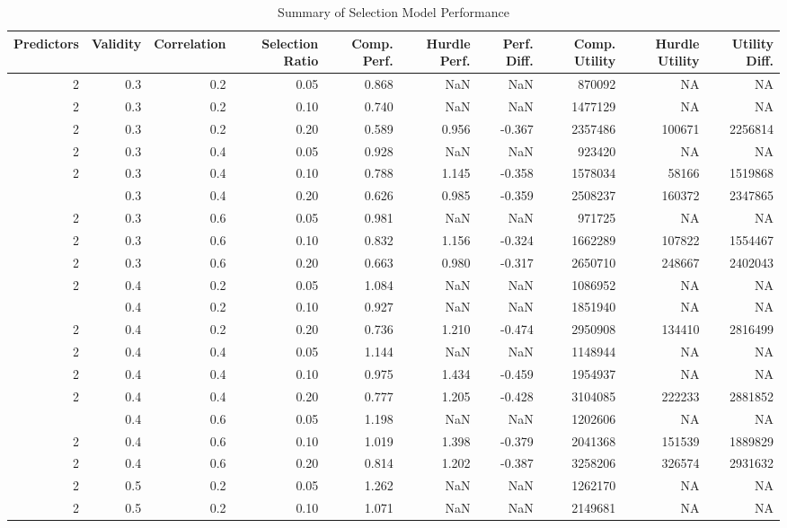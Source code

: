 \documentclass[
]{article}
\begin{document}
\begin{longtable}[t]{rrrrrrrrrr}
\caption{\label{tab:overall_results}Summary of Selection Model Performance}\\
\toprule
Predictors & Validity & Correlation & Selection Ratio & Comp. Perf. & Hurdle Perf. & Perf. Diff. & Comp. Utility & Hurdle Utility & Utility Diff.\\
\midrule
2 & 0.3 & 0.2 & 0.05 & 0.868 & NaN & NaN & 870092 & NA & NA\\
2 & 0.3 & 0.2 & 0.10 & 0.740 & NaN & NaN & 1477129 & NA & NA\\
2 & 0.3 & 0.2 & 0.20 & 0.589 & 0.956 & -0.367 & 2357486 & 100671 & 2256814\\
2 & 0.3 & 0.4 & 0.05 & 0.928 & NaN & NaN & 923420 & NA & NA\\
2 & 0.3 & 0.4 & 0.10 & 0.788 & 1.145 & -0.358 & 1578034 & 58166 & 1519868\\
\addlinespace
2 & 0.3 & 0.4 & 0.20 & 0.626 & 0.985 & -0.359 & 2508237 & 160372 & 2347865\\
2 & 0.3 & 0.6 & 0.05 & 0.981 & NaN & NaN & 971725 & NA & NA\\
2 & 0.3 & 0.6 & 0.10 & 0.832 & 1.156 & -0.324 & 1662289 & 107822 & 1554467\\
2 & 0.3 & 0.6 & 0.20 & 0.663 & 0.980 & -0.317 & 2650710 & 248667 & 2402043\\
2 & 0.4 & 0.2 & 0.05 & 1.084 & NaN & NaN & 1086952 & NA & NA\\
\addlinespace
2 & 0.4 & 0.2 & 0.10 & 0.927 & NaN & NaN & 1851940 & NA & NA\\
2 & 0.4 & 0.2 & 0.20 & 0.736 & 1.210 & -0.474 & 2950908 & 134410 & 2816499\\
2 & 0.4 & 0.4 & 0.05 & 1.144 & NaN & NaN & 1148944 & NA & NA\\
2 & 0.4 & 0.4 & 0.10 & 0.975 & 1.434 & -0.459 & 1954937 & NA & NA\\
2 & 0.4 & 0.4 & 0.20 & 0.777 & 1.205 & -0.428 & 3104085 & 222233 & 2881852\\
\addlinespace
2 & 0.4 & 0.6 & 0.05 & 1.198 & NaN & NaN & 1202606 & NA & NA\\
2 & 0.4 & 0.6 & 0.10 & 1.019 & 1.398 & -0.379 & 2041368 & 151539 & 1889829\\
2 & 0.4 & 0.6 & 0.20 & 0.814 & 1.202 & -0.387 & 3258206 & 326574 & 2931632\\
2 & 0.5 & 0.2 & 0.05 & 1.262 & NaN & NaN & 1262170 & NA & NA\\
2 & 0.5 & 0.2 & 0.10 & 1.071 & NaN & NaN & 2149681 & NA & NA\\

\end{longtable}
\end{document}
